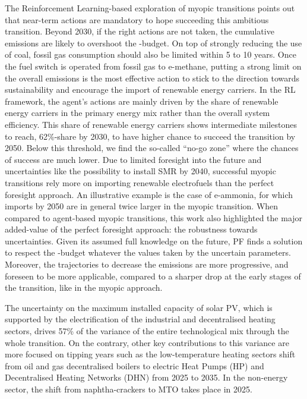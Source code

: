 The Reinforcement Learning-based exploration of myopic transitions points out that near-term actions are mandatory to hope succeeding this ambitious transition.  Beyond 2030, if the right actions are not taken, the cumulative emissions are likely to overshoot the -budget. On top of strongly reducing the use of coal, fossil gas consumption should also be limited within 5 to 10 years. Once the fuel switch is operated from fossil gas to e-methane, putting a strong limit on the overall emissions is the most effective action to stick to the direction towards sustainability and encourage the import of renewable energy carriers. In the \gls{RL} framework, the agent's actions are mainly driven by the share of renewable energy carriers in the primary energy mix rather than the overall system efficiency. This share of renewable energy carriers shows intermediate milestones to reach, 62\%-share by 2030, to have higher chance to succeed the transition by 2050. Below this threshold, we find the so-called ``no-go zone'' where the chances of success are much lower. Due to limited foresight into the future and uncertainties like the possibility to install \gls{SMR} by 2040, successful myopic transitions rely more on importing renewable electrofuels than the perfect foresight approach. An illustrative example is the case of e-ammonia, for which imports by 2050 are in general twice larger in the myopic transition. When compared to agent-based myopic transitions, this work also highlighted the major added-value of the perfect foresight approach: the robustness towards uncertainties. Given its assumed full knowledge on the future, PF finds a solution to respect the -budget whatever the values taken by the uncertain parameters. Moreover, the trajectories to decrease the  emissions are more progressive, and foreseen to be more applicable, compared to a sharper drop at the early stages of the transition, like in the myopic approach.

The uncertainty on the maximum installed capacity of solar \gls{PV}, which is supported by the electrification of the industrial and decentralised heating sectors, drives 57\% of the variance of the entire technological mix through the whole transition. On the contrary, other key contributions to this variance are more focused on tipping years such as the low-temperature heating sectors shift from oil and gas decentralised boilers to electric Heat Pumps (HP) and Decentralised Heating Networks (DHN) from 2025 to 2035. In the non-energy sector, the shift from naphtha-crackers to \acrfull{MTO} takes place in 2025.

